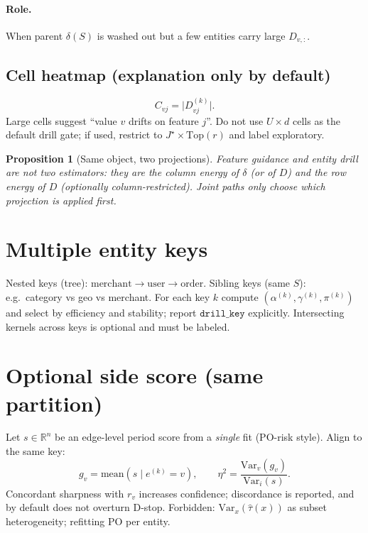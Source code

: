 \documentclass[11pt]{article}
\newtheorem{proposition}{Proposition}
\newcommand{\R}{\mathbb{R}}
\begin{document}
\paragraph{Role.} When parent \(\delta(S)\) is washed out but a few
entities carry large \(D_{v,:}\).

\subsection{Cell heatmap (explanation only by default)}
\[
  C_{vj}=\bigl|D^{(k)}_{vj}\bigr|.
\]
Large cells suggest ``value \(v\) drifts on feature \(j\)''. Do not use
\(U\times d\) cells as the default drill gate; if used, restrict to
\(J^\star\times\mathrm{Top}(r)\) and label exploratory.

\begin{proposition}[Same object, two projections]
Feature guidance and entity drill are not two estimators: they are the
column energy of \(\delta\) (or of \(D\)) and the row energy of \(D\)
(optionally column-restricted). Joint paths only choose
\emph{which projection is applied first}.
\end{proposition}

\section{Multiple entity keys}
\label{sec:keys}

Nested keys (tree): \(\mathrm{merchant}\to\mathrm{user}\to\mathrm{order}\).
Sibling keys (same \(S\)): e.g.\ category vs geo vs merchant. For each
key \(k\) compute \((\alpha^{(k)},\gamma^{(k)},\pi^{(k)})\) and select
by efficiency and stability; report \(\texttt{drill\_key}\) explicitly.
Intersecting kernels across keys is optional and must be labeled.

\section{Optional side score (same partition)}
\label{sec:po}

Let \(s\in\R^n\) be an edge-level period score from a \emph{single} fit
(PO-risk style). Align to the same key:
\[
  g_v=\mathrm{mean}(s\mid e^{(k)}=v),\qquad
  \eta^2=\frac{\mathrm{Var}_v(g_v)}{\mathrm{Var}_i(s)}.
\]
Concordant sharpness with \(r_v\) increases confidence; discordance is
reported, and by default does not overturn D-stop. Forbidden:
\(\mathrm{Var}_x(\hat\tau(x))\) as subset heterogeneity; refitting PO
per entity.
\end{document}
